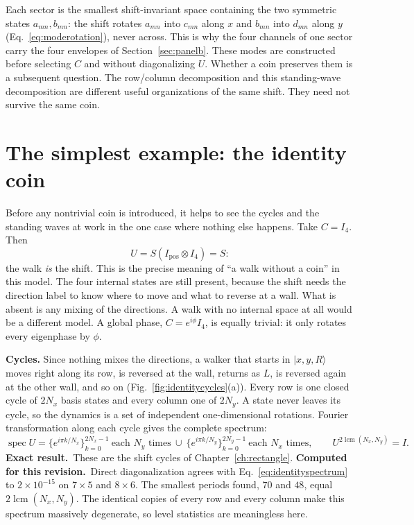 \documentclass[11pt,a4paper,oneside]{report}
\newcommand{\ket}[1]{\lvert #1\rangle}
\newcommand{\Id}{I}
\newcommand{\spec}{\operatorname{spec}}
\newcommand{\exact}{\textbf{Exact result.}\ }
\newcommand{\session}{\textbf{Computed for this revision.}\ }
\numberwithin{equation}{chapter}
\begin{document}
Each sector is the smallest shift-invariant space containing the two
symmetric states \(a_{mn},b_{mn}\): the shift rotates \(a_{mn}\) into
\(c_{mn}\) along \(x\) and \(b_{mn}\) into \(d_{mn}\) along \(y\)
(Eq.~\eqref{eq:moderotation}), never across. This is why the four
channels of one sector carry the four envelopes of
Section~\ref{sec:panelb}. These modes are constructed before selecting
\(C\) and without diagonalizing \(U\). Whether a coin preserves them is a subsequent
question. The row/column decomposition and this standing-wave
decomposition are different useful organizations of the same shift.
They need not survive the same coin.

\section{The simplest example: the identity coin}
\label{sec:identitycoin}

Before any nontrivial coin is introduced, it helps to see the cycles and
the standing waves at work in the one case where nothing else happens.
Take \(C=\Id_4\). Then
\begin{equation}
U=S(\Id_{\mathrm{pos}}\otimes\Id_4)=S:
\end{equation}
the walk \emph{is} the shift. This is the precise meaning of ``a walk
without a coin'' in this model. The four internal states are still
present, because the shift needs the direction label to know where to
move and what to reverse at a wall. What is absent is any mixing of the
directions. A walk with no internal space at all would be a different
model. A global phase, \(C=e^{i\phi}\Id_4\), is equally trivial: it only
rotates every eigenphase by \(\phi\).

\textbf{Cycles.} Since nothing mixes the directions, a walker that starts
in \(\ket{x,y,R}\) moves right along its row, is reversed at the wall,
returns as \(L\), is reversed again at the other wall, and so on
(Fig.~\ref{fig:identitycycles}(a)). Every row is one closed cycle of
\(2N_x\) basis states and every column one of \(2N_y\). A state never
leaves its cycle, so the dynamics is a set of independent
one-dimensional rotations. Fourier transformation along each cycle gives
the complete spectrum:
\begin{equation}
\spec U=\Big\{e^{i\pi k/N_x}\Big\}_{k=0}^{2N_x-1}\ \text{each }N_y\text{ times}
\ \cup\
\Big\{e^{i\pi k/N_y}\Big\}_{k=0}^{2N_y-1}\ \text{each }N_x\text{ times},
\qquad U^{2\operatorname{lcm}(N_x,N_y)}=\Id .
\label{eq:identityspectrum}
\end{equation}
\exact These are the shift cycles of Chapter~\ref{ch:rectangle}.
\session Direct diagonalization agrees with
Eq.~\eqref{eq:identityspectrum} to \(2\times10^{-15}\) on \(7\times5\)
and \(8\times6\). The smallest periods found, \(70\) and \(48\), equal
\(2\operatorname{lcm}(N_x,N_y)\). The identical copies of every row and
every column make this spectrum massively degenerate, so level
statistics are meaningless here.
\end{document}
